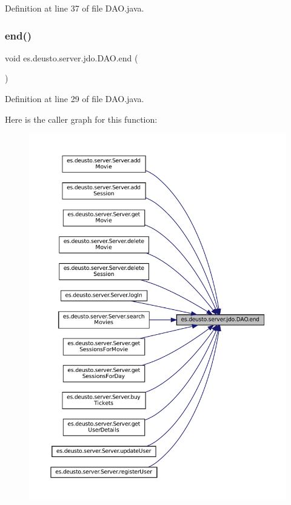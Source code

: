 Definition at line 37 of file D\+A\+O.\+java.

\mbox{\label{classes_1_1deusto_1_1server_1_1jdo_1_1_d_a_o_a376574d8ad006d0bad98e39172b67847}} 
\subsubsection{\texorpdfstring{end()}{end()}}
{\footnotesize\ttfamily void es.\+deusto.\+server.\+jdo.\+D\+A\+O.\+end (\begin{DoxyParamCaption}{ }\end{DoxyParamCaption})}



Definition at line 29 of file D\+A\+O.\+java.

Here is the caller graph for this function\+:
\nopagebreak
\begin{figure}[H]
\begin{center}
\leavevmode
\includegraphics[width=350pt]{classes_1_1deusto_1_1server_1_1jdo_1_1_d_a_o_a376574d8ad006d0bad98e39172b67847_icgraph}
\end{center}
\end{figure}
\mbox{\label{classes_1_1deusto_1_1server_1_1jdo_1_1_d_a_o_a340f51843de8957e9ef8b0c95081512a}} 
